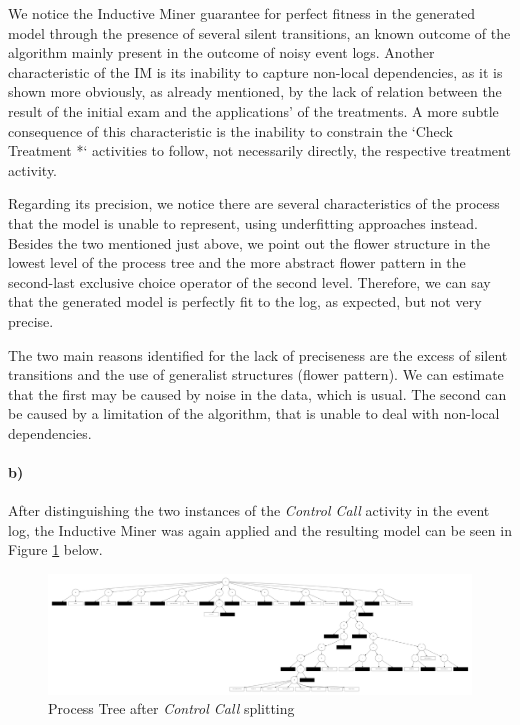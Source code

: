 \documentclass[12pt]{report}
\begin{document}
We notice the Inductive Miner guarantee for perfect fitness in the generated model through the presence of several silent transitions, an known outcome of the algorithm mainly present in the outcome of noisy event logs. Another characteristic of the IM is its inability to capture non-local dependencies, as it is shown more obviously, as already mentioned, by the lack of relation between the result of the initial exam and the applications' of the treatments. A more subtle consequence of this characteristic is the inability to constrain the `Check Treatment *` activities to follow, not necessarily directly, the respective treatment activity.

Regarding its precision, we notice there are several characteristics of the process that the model is unable to represent, using underfitting approaches instead. Besides the two mentioned just above, we point out the flower structure in the lowest level of the process tree and the more abstract flower pattern in the second-last exclusive choice operator of the second level. Therefore, we can say that the generated model is perfectly fit to the log, as expected, but not very precise.

The two main reasons identified for the lack of preciseness are the excess of silent transitions and the use of generalist structures (flower pattern). We can estimate that the first may be caused by noise in the data, which is usual. The second can be caused by a limitation of the algorithm, that is unable to deal with non-local dependencies.

\paragraph{b)} 

After distinguishing the two instances of the \emph{Control Call} activity in the event log, the Inductive Miner was again applied and the resulting model can be seen in Figure \ref{fig:figures-q1_b_tree-pdf} below.

\begin{figure}[h]
    \centering
    \includegraphics[width=\textwidth]{figures/q1_b_tree.pdf}
    \caption{Process Tree after \emph{Control Call} splitting}
    \label{fig:figures-q1_b_tree-pdf}
\end{figure}
\end{document}
